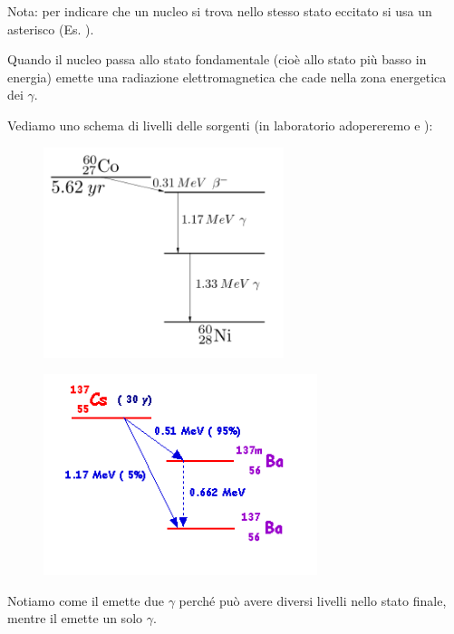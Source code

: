 Nota: per indicare che un nucleo si trova nello stesso stato eccitato si usa un asterisco (Es. ).

Quando il nucleo passa allo stato fondamentale (cioè allo stato più basso in energia) emette una radiazione elettromagnetica che cade nella zona energetica dei $\gamma$.

Vediamo uno schema di livelli delle sorgenti (in laboratorio adopereremo  e ):

\vspace{-0.4cm}\begin{minipage}{0.5\textwidth}
    \begin{figure}[H]
        \centering
        \includegraphics[width=7cm]{immagini/spettro_decadimento_gamma_1.png}
    \end{figure}
\end{minipage}
\begin{minipage}{0.5\textwidth}
    \begin{figure}[H]
        \centering
        \includegraphics[width=8cm]{immagini/spettro_decadimento_gamma_2.png}
    \end{figure}
\end{minipage}

Notiamo come il  emette due $\gamma$ perché può avere diversi livelli nello stato finale, mentre il  emette un solo $\gamma$.

